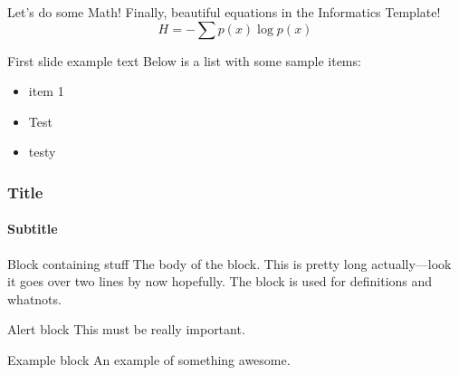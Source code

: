 \documentclass[aspectratio=169]{beamer}
\begin{document}
\begin{frame}{Let's do some Math!}
  Finally, beautiful equations in the Informatics Template!
  \begin{equation}
    H = -\sum p(x)\log p(x)
  \end{equation}
\end{frame}

\begin{frame}{First slide example text}
  Below is a list with some sample items:
  \begin{itemize}
    \item{item 1}
    \item{Test}
    \item{testy}
  \end{itemize}
\end{frame}

\begin{frame}
  \frametitle{Title}
  \framesubtitle{Subtitle}
  \begin{block}{Block containing stuff}
    The body of the block. This is pretty long actually---look it goes over two lines by now hopefully. The block is used for definitions and whatnots.
  \end{block}
  \begin{alertblock}{Alert block}
    This must be really important.
  \end{alertblock}
  \begin{exampleblock}{Example block}
    An example of something awesome.
  \end{exampleblock}
\end{frame}

\begin{frame}
  \maketitle
\end{frame}
\end{document}
